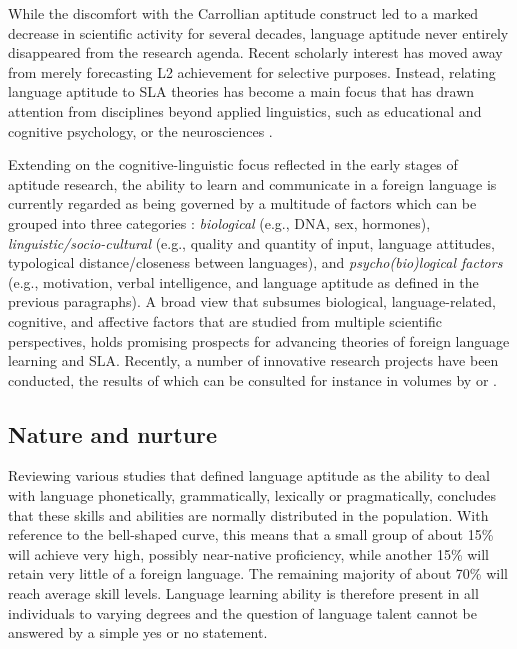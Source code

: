 \documentclass[output=paper]{langsci/langscibook}
\begin{document}
While the discomfort with the Carrollian aptitude construct led to a marked decrease in scientific activity for several decades, language aptitude never entirely disappeared from the research agenda. Recent scholarly interest has moved away from merely forecasting L2 achievement for selective purposes. Instead, relating language aptitude to SLA theories has become a main focus that has drawn attention from disciplines beyond applied linguistics, such as educational and cognitive psychology, or the neurosciences \citep{WenEtAl2019Researching}. 

Extending on the cognitive-linguistic focus reflected in the early stages of aptitude research, the ability to learn and communicate in a foreign language is currently regarded as being governed by a multitude of factors which can be grouped into three categories \citep{Reiterer2009}: \textit{biological} (e.g., DNA, sex, hormones), \textit{linguistic\slash socio-cultural} (e.g., quality and quantity of input, language attitudes, typological distance/closeness between languages), and \textit{psycho(bio)logical factors} (e.g., motivation, verbal intelligence, and language aptitude as defined in the previous paragraphs). A broad view that subsumes biological, language-related, cognitive, and affective factors that are studied from multiple scientific perspectives, holds promising prospects for advancing theories of foreign language learning and SLA. Recently, a number of innovative research projects have been conducted, the results of which can be consulted for instance in volumes by \citet{Reiterer2019} or \citet{WenEtAl2019}. 

\subsection{Nature and nurture}

Reviewing various studies that defined language aptitude as the ability to deal with language phonetically, grammatically, lexically or pragmatically, \citet{Reiterer2019} concludes that these skills and abilities are normally distributed in the population. With reference to the bell-shaped curve, this means that a small group of about 15\% will achieve very high, possibly near-native proficiency, while another 15\% will retain very little of a foreign language. The remaining majority of about 70\% will reach average skill levels. Language learning ability is therefore present in all individuals to varying degrees and the question of language talent cannot be answered by a simple yes or no statement.
\end{document}
